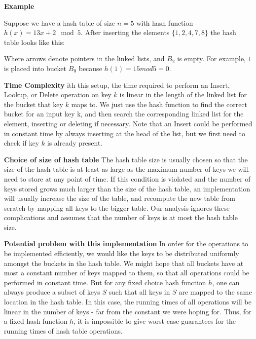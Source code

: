 \documentclass [12pt]{article}
\begin{document}
\textbf{Example}

Suppose we have a hash table of size $n = 5$ with hash function $h(x) = 13x + 2 \mod 5$. After inserting the elements $\{1, 2, 4, 7, 8\}$ the hash table looks like this:

\begin{center}
\end{center}

Where arrows denote pointers in the linked lists, and $B_2$ is empty. For example, $1$ is placed into bucket $B_0$ because $h(1) = 15 mod 5 = 0$.

\textbf{Time Complexity} 
ith this setup, the time required to perform an Insert, Lookup, or Delete operation on key $k$ is linear in the length of the linked list for the bucket that key $k$ maps to. We just use the hash function to find the correct bucket for an input key k, and then search the corresponding linked list for the element, inserting or deleting if necessary. Note that an Insert could be performed in constant time by always inserting at the head of the list, but we first need to check if key $k$ is already present.

\textbf{Choice of size of hash table} 
The hash table size is usually chosen so that the size of the hash table is at least as large as the maximum number of keys we will need to store at any point of time. If this condition is violated and the number of keys stored grows much larger than the size of the hash table, an implementation will usually increase the size of the table, and recompute the new table from scratch by mapping all keys to the bigger table. Our analysis ignores these complications and assumes that the number of keys is at most the hash table size.

\textbf{Potential problem with this implementation} 
In order for the operations to be implemented efficiently, we would like the keys to be distributed uniformly amongst the buckets in the hash table. We might hope that all buckets have at most a constant number of keys mapped to them, so that all operations could be performed in constant time. But for any fixed choice hash function $h$, one can always produce a subset of keys $S$ such that all keys in $S$ are mapped to the same location in the hash table. In this case, the running times of all operations will be linear in the number of keys - far from the constant we were hoping for. Thus, for a fixed hash function $h$, it is impossible to give worst case guarantees for the running times of hash table operations.
\end{document}
